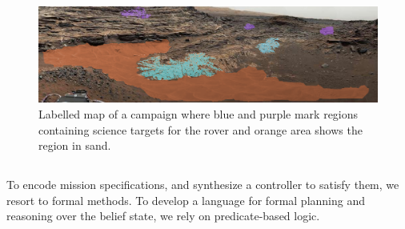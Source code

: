 \documentclass[conference]{IEEEtran}
\begin{document}
    
	\begin{figure}[t!]
    	\centering
    	\includegraphics[width=1.7\columnwidth]{figs/MarsLabelledWithSand.png}
    	\caption{Labelled map of a %
    	campaign where blue and purple mark regions containing science targets for the rover and orange area shows the region in sand.}
    	\label{fig:Scenario}
    \end{figure}
    
	\subsection{\DTL}\label{sec:DTL}
    To encode mission specifications, and synthesize a controller to satisfy them, we resort to formal methods. To develop a language for formal planning and reasoning over the belief state, we rely on predicate-based logic.
    
    
    
\end{document}
